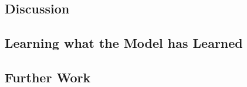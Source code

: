 \subsection{Discussion}

\subsection{Learning what the Model has Learned}

\subsection{Further Work}
